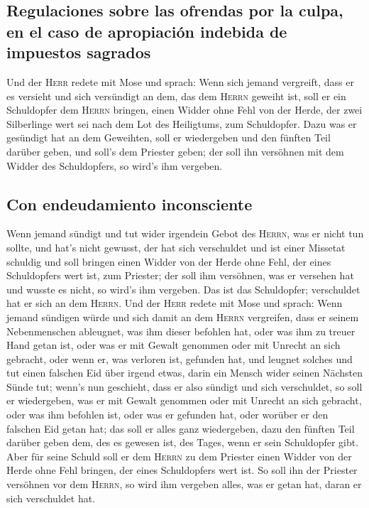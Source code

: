 \hypertarget{regulaciones-sobre-las-ofrendas-por-la-culpa-en-el-caso-de-apropiaciuxf3n-indebida-de-impuestos-sagrados}{%
\subsection{Regulaciones sobre las ofrendas por la culpa, en el caso de
apropiación indebida de impuestos
sagrados}\label{regulaciones-sobre-las-ofrendas-por-la-culpa-en-el-caso-de-apropiaciuxf3n-indebida-de-impuestos-sagrados}}

 Und der \textsc{Herr} redete mit Mose und sprach:
 Wenn sich jemand vergreift, dass er es versieht und sich
versündigt an dem, das dem \textsc{Herrn} geweiht ist, soll er ein
Schuldopfer dem \textsc{Herrn} bringen, einen Widder ohne Fehl von der
Herde, der zwei Silberlinge wert sei nach dem Lot des Heiligtums, zum
Schuldopfer.  Dazu was er gesündigt hat an dem Geweihten,
soll er wiedergeben und den fünften Teil darüber geben, und soll's dem
Priester geben; der soll ihn versöhnen mit dem Widder des Schuldopfers,
so wird's ihm vergeben.

\hypertarget{con-endeudamiento-inconsciente}{%
\subsection{Con endeudamiento
inconsciente}\label{con-endeudamiento-inconsciente}}

 Wenn jemand sündigt und tut wider irgendein Gebot des
\textsc{Herrn}, was er nicht tun sollte, und hat's nicht gewusst, der
hat sich verschuldet und ist einer Missetat schuldig  und
soll bringen einen Widder von der Herde ohne Fehl, der eines
Schuldopfers wert ist, zum Priester; der soll ihm versöhnen, was er
versehen hat und wusste es nicht, so wird's ihm vergeben.
 Das ist das Schuldopfer; verschuldet hat er sich an dem
\textsc{Herrn}.  Und der \textsc{Herr} redete mit Mose
und sprach:  Wenn jemand sündigen würde und sich damit an
dem \textsc{Herrn} vergreifen, dass er seinem Nebenmenschen ableugnet,
was ihm dieser befohlen hat, oder was ihm zu treuer Hand getan ist, oder
was er mit Gewalt genommen oder mit Unrecht an sich gebracht,
 oder wenn er, was verloren ist, gefunden hat, und
leugnet solches und tut einen falschen Eid über irgend etwas, darin ein
Mensch wider seinen Nächsten Sünde tut;  wenn's nun
geschieht, dass er also sündigt und sich verschuldet, so soll er
wiedergeben, was er mit Gewalt genommen oder mit Unrecht an sich
gebracht, oder was ihm befohlen ist, oder was er gefunden hat,
 oder worüber er den falschen Eid getan hat; das soll er
alles ganz wiedergeben, dazu den fünften Teil darüber geben dem, des es
gewesen ist, des Tages, wenn er sein Schuldopfer gibt. 
Aber für seine Schuld soll er dem \textsc{Herrn} zu dem Priester einen
Widder von der Herde ohne Fehl bringen, der eines Schuldopfers wert ist.
 So soll ihn der Priester versöhnen vor dem
\textsc{Herrn}, so wird ihm vergeben alles, was er getan hat, daran er
sich verschuldet hat.

